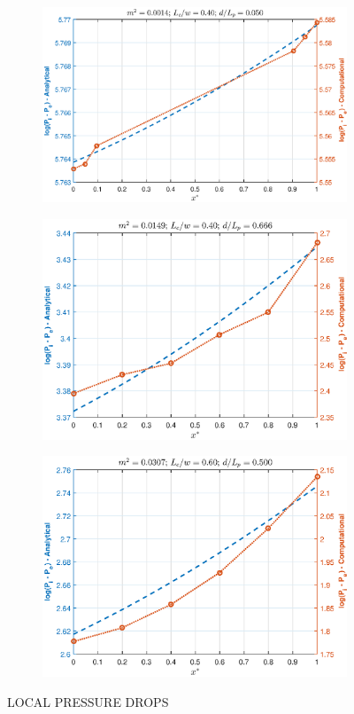 \documentclass[twocolumn,10pt,cleanfoot]{ihmtc}
\begin{document}
\begin{figure}
\centering
   \begin{subfigure}[b]{0.55\textwidth}
   \includegraphics[height=0.55\linewidth,width=0.90\linewidth]{pres_a.eps}
   \caption{}
   \label{pres_a} 
\end{subfigure}
%
   \begin{subfigure}[b]{0.55\textwidth}
   \includegraphics[height=0.55\linewidth,width=0.90\linewidth]{pres_b.eps}
   \caption{}
   \label{pres_b} 
\end{subfigure}
%
%
   \begin{subfigure}[b]{0.55\textwidth}
   \includegraphics[height=0.55\linewidth,width=0.90\linewidth]{pres_c.eps}
   \caption{}
   \label{pres_c} 
\end{subfigure}
%
\caption{LOCAL PRESSURE DROPS}
\vspace{-3em}
\end{figure}
%
%
\end{document}

